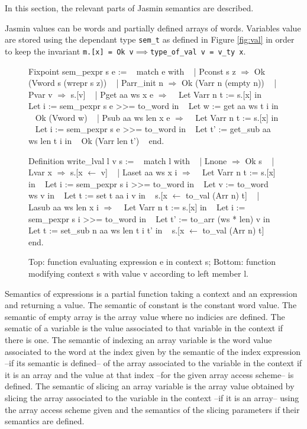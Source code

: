 \documentclass{article}
\begin{document}
In this section, the relevant parts of Jasmin semantics are described.

Jasmin values can be words and partially defined arrays of words. Variables value
are stored using the dependant type \texttt{sem\_t} as defined in Figure
\ref{fig:val} in order to keep the invariant
\texttt{m.[x] = Ok v\(\implies\)type\_of\_val v = v\_ty x}.

\medskip

\begin{figure}[!t]
\obeylines\obeyspaces\ttfamily%
Fixpoint sem\_pexpr s e :=
~ match e with
~ | Pconst s z \(\Rightarrow\) Ok (Vword s (wrepr s z))
~ | Parr\_init n \(\Rightarrow\) Ok (Varr n (empty n))
~ | Pvar v \(\Rightarrow\) s.[v]
~ | Pget aa ws x e \(\Rightarrow\)
~   Let Varr n t := s.[x] in
~   Let i := sem\_pexpr s e >{}>= to\_word in
~   Let w := get aa ws t i in
~   Ok (Vword w)
~ | Psub aa ws len x e \(\Rightarrow\)
~   Let Varr n t := s.[x] in
~   Let i := sem\_pexpr s e >{}>= to\_word in
~   Let t' := get\_sub aa ws len t i in
~   Ok (Varr len t')
~ end.

Definition write\_lval l v s :=
~ match l with
~ | Lnone \(\Rightarrow\) Ok s
~ | Lvar x \(\Rightarrow\) s.[x \(\leftarrow\) v]
~ | Laset aa ws x i \(\Rightarrow\)
~   Let Varr n t := s.[x] in
~   Let i := sem\_pexpr s i >{}>= to\_word in
~   Let v := to\_word ws v in
~   Let t := set t aa i v in
~   s.[x \(\leftarrow\) to\_val (Arr n) t]
~ | Lasub aa ws len x i \(\Rightarrow\)
~   Let Varr n t := s.[x] in
~   Let i := sem\_pexpr s i >{}>= to\_word in
~   Let t' := to\_arr (ws * len) v in 
~   Let t := set\_sub n aa ws len t i t' in
~   s.[x \(\leftarrow\) to\_val (Arr n) t]
~ end.
\normalfont%
\caption{Top: function evaluating expression e in context s; %
Bottom: function modifying context s with value v according to left member l.}
\end{figure}

Semantics of expressions is a partial function taking a context and an
expression and returning a value.
The semantic of constant is the constant word value. The semantic of empty array
is the array value where no indicies are defined. The sematic of a variable is
the value associated to that variable in the context if there is one. The
semantic of indexing an array variable is the word value associated to the word
at the index given by the semantic of the index expression --if its semantic
is defined-- of the array associated to the variable in the context if it is an
array and the value at that index --for the given array access scheme-- is
defined. The semantic of slicing an array variable is the array value obtained
by slicing the array associated to the variable in the context --if it is an
array-- using the array access scheme given and the semantics of the slicing
parameters if their semantics are defined.
\end{document}
